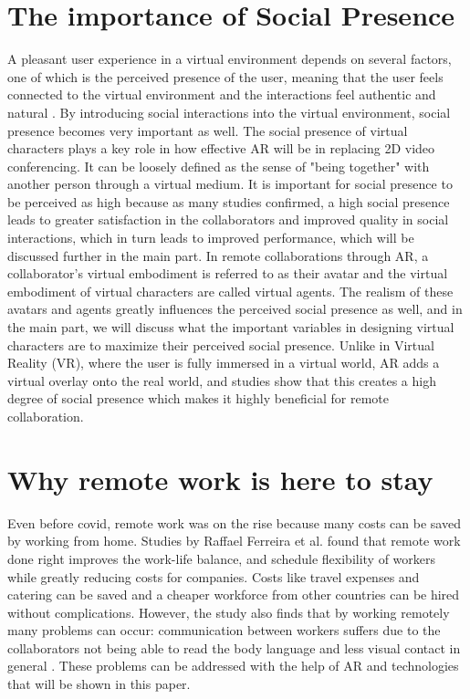 \section{The importance of Social Presence}
A pleasant user experience in a virtual environment depends on several factors, one of which is the perceived presence of the user, meaning that the user feels connected to the virtual environment and the interactions feel authentic and natural \cite{PresencePaper}. By introducing social interactions into the virtual environment, social presence becomes very important as well. The social presence of virtual characters plays a key role in how effective AR will be in replacing 2D video conferencing. It can be loosely defined as the sense of "being together" with another person through a virtual medium. It is important for social presence to be perceived as high because as many studies confirmed, a high social presence leads to greater satisfaction in the collaborators and improved quality in social interactions, which in turn leads to improved performance, which will be discussed further in the main part. In remote collaborations through AR, a collaborator's virtual embodiment is referred to as their avatar and the virtual embodiment of virtual characters are called virtual agents. The realism of these avatars and agents greatly influences the perceived social presence as well, and in the main part, we will discuss what the important variables in designing virtual characters are to maximize their perceived social presence. \cite{10.1117/12.387188}
Unlike in Virtual Reality (VR), where the user is fully immersed in a virtual world, AR adds a virtual overlay onto the real world, and studies show that this creates a high degree of social presence which makes it highly beneficial for remote collaboration.

\section{Why remote work is here to stay}

Even before covid, remote work was on the rise because many costs can be saved by working from home. Studies by Raffael Ferreira et al. found that remote work done right improves the work-life balance, and schedule flexibility of workers while greatly reducing costs for companies. Costs like travel expenses and catering can be saved and a cheaper workforce from other countries can be hired without complications. However, the study also finds that by working remotely many problems can occur: communication between workers suffers due to the collaborators not being able to read the body language and less visual contact in general \cite{joitmc7010070}. These problems can be addressed with the help of AR and technologies that will be shown in this paper.



